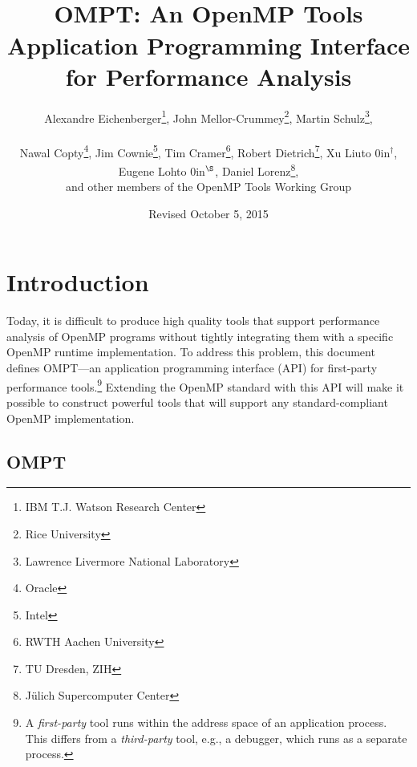 \documentclass{article}
\title{OMPT: An OpenMP\textsuperscript{\textregistered} Tools Application Programming Interface for Performance Analysis}
\author{Alexandre Eichenberger\thanks{IBM T.J. Watson Research Center}, 
John Mellor-Crummey\thanks{Rice University}, 
Martin Schulz\thanks{Lawrence Livermore National Laboratory},
\\~\\
Nawal Copty\thanks{Oracle}, 
Jim Cownie\thanks{Intel},
Tim Cramer\thanks{RWTH Aachen University}, 
Robert Dietrich\thanks{TU Dresden, ZIH},
Xu Liu\hbox to 0in{$^\dagger$\hss},
Eugene Loh\hbox to 0in{$^\S$\hss}, 
Daniel Lorenz\thanks{J\"{u}lich Supercomputer Center}, 
\\
and other members of the OpenMP Tools Working Group}
\date{Revised October 5, 2015}
\begin{document}
  

                                           
\maketitle
\section{Introduction}
Today, it is difficult to produce high quality tools that support 
performance analysis of OpenMP programs without tightly integrating them with a specific OpenMP runtime implementation. To address this problem, this document defines OMPT---an application programming interface (API) for first-party performance tools.\footnote{A {\em first-party} tool runs within the address space of an application process. This differs from a {\em third-party} tool, e.g., a debugger, which runs as a separate process.}  
Extending the OpenMP standard with this API  will make it possible to construct powerful tools that will support any standard-compliant OpenMP implementation.

\subsection{OMPT}
\end{document}
